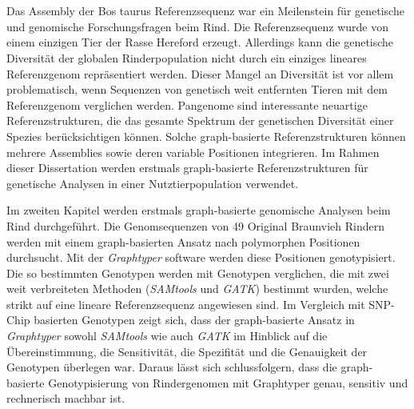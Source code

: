 \documentclass[11 pt, a4paper, notitlepage, twoside]{report}
\begin{document}
\newpage

\thispagestyle{plain}
{}
\section*{}

Das Assembly der Bos taurus Referenzsequenz war ein Meilenstein für genetische und genomische Forschungsfragen beim Rind. Die Referenzsequenz wurde von einem einzigen Tier der Rasse Hereford erzeugt. Allerdings kann die genetische Diversität der globalen Rinderpopulation nicht durch ein einziges lineares Referenzgenom repräsentiert werden. Dieser Mangel an Diversität ist vor allem problematisch, wenn Sequenzen von genetisch weit entfernten Tieren mit dem Referenzgenom verglichen werden. Pangenome sind interessante neuartige Referenzstrukturen, die das gesamte Spektrum der genetischen Diversität einer Spezies berücksichtigen können. Solche  graph-basierte Referenzstrukturen können mehrere Assemblies sowie deren variable Positionen integrieren. Im Rahmen dieser Dissertation werden erstmals graph-basierte Referenzstrukturen für genetische Analysen in einer Nutztierpopulation verwendet.

Im zweiten Kapitel werden erstmals graph-basierte genomische Analysen beim Rind durchgeführt. Die Genomsequenzen von 49 Original Braunvieh Rindern werden mit einem graph-basierten Ansatz nach polymorphen Positionen durchsucht. Mit der \emph{Graphtyper} software werden diese Positionen genotypisiert. Die so bestimmten Genotypen werden mit Genotypen verglichen, die mit zwei weit verbreiteten Methoden (\emph{SAMtools} und \emph{GATK}) bestimmt wurden, welche strikt auf eine lineare Referenzsequenz angewiesen sind. Im Vergleich mit SNP-Chip basierten Genotypen zeigt sich, dass der graph-basierte Ansatz in \emph{Graphtyper} sowohl \emph{SAMtools} wie auch \emph{GATK} im Hinblick auf die Übereinstimmung, die Sensitivität, die Spezifität und die Genauigkeit der Genotypen überlegen war. Daraus lässt sich schlussfolgern, dass die graph-basierte Genotypisierung von Rindergenomen mit Graphtyper genau, sensitiv und rechnerisch machbar ist.
\end{document}
